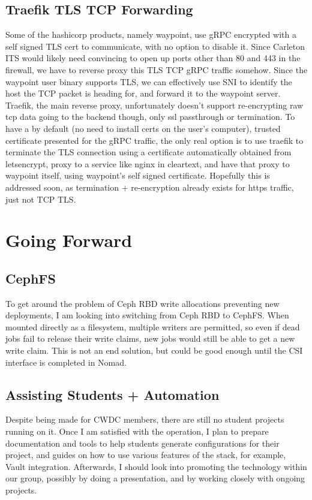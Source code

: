 \documentclass{article}
\begin{document}
\subsection{Traefik TLS TCP Forwarding}
Some of the hashicorp products, namely waypoint, use gRPC encrypted with a self signed TLS cert to communicate, with no option to disable it. Since Carleton ITS would likely need convincing to open up ports other than 80 and 443 in the firewall, we have to reverse proxy this TLS TCP gRPC traffic somehow. Since the waypoint user binary supports TLS, we can effectively use SNI to identify the host the TCP packet is heading for, and forward it to the waypoint server. Traefik, the main reverse proxy, unfortunately doesn't support re-encrypting raw tcp data going to the backend though, only ssl passthrough or termination. To have a by default (no need to install certs on the user's computer), trusted certificate presented for the gRPC traffic, the only real option is to use traefik to terminate the TLS connection using a certificate automatically obtained from letsencrypt, proxy to a service like nginx in cleartext, and have that proxy to waypoint itself, using waypoint's self signed certificate. Hopefully this is addressed soon, as termination + re-encryption already exists for https traffic, just not TCP TLS. 

\section*{Going Forward}
\subsection*{CephFS}
To get around the problem of Ceph RBD write allocations preventing new deployments, I am looking into switching from Ceph RBD to CephFS. When mounted directly as a filesystem, multiple writers are permitted, so even if dead jobs fail to release their write claims, new jobs would still be able to get a new write claim. This is not an end solution, but could be good enough until the CSI interface is completed in Nomad.

\subsection*{Assisting Students + Automation}
Despite being made for CWDC members, there are still no student projects running on it. Once I am satisfied with the operation, I plan to prepare documentation and tools to help students generate configurations for their project, and guides on how to use various features of the stack, for example, Vault integration. Afterwards, I should look into promoting the technology within our group, possibly by doing a presentation, and by working closely with ongoing projects.
\end{document}
